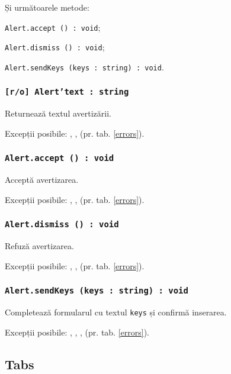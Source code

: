 Și următoarele metode:
\begin{icItems}
	\item \texttt{Alert.accept () : void};
	\item \texttt{Alert.dismiss () : void};
	\item \texttt{Alert.sendKeys (keys : string) : void}.
\end{icItems}

\subsubsection{\texttt{[r/o] Alert'text : string}}

Returnează textul avertizării.

Excepții posibile: , ,  (pr. tab. \ref{errors}).

\subsubsection{\texttt{Alert.accept () : void}}

Acceptă avertizarea.

Excepții posibile: , ,  (pr. tab. \ref{errors}).

\subsubsection{\texttt{Alert.dismiss () : void}}

Refuză avertizarea.

Excepții posibile: , ,  (pr. tab. \ref{errors}).

\subsubsection{\texttt{Alert.sendKeys (keys : string) : void}}

Completează formularul cu textul \texttt{keys} și confirmă inserarea.

Excepții posibile: , , ,  (pr. tab. \ref{errors}).

\subsection{{\color{orange} Tabs}}

